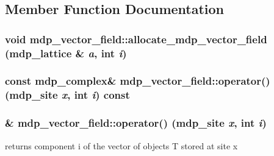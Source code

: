 \subsection{Member Function Documentation}
\hypertarget{classmdp__vector__field_ad8c24094484c978db191b9aab575d528}{
\subsubsection[{allocate\_\-mdp\_\-vector\_\-field}]{\setlength{\rightskip}{0pt plus 5cm}void mdp\_\-vector\_\-field::allocate\_\-mdp\_\-vector\_\-field ({\bf mdp\_\-lattice} \& {\em a}, \/  int {\em i})}}
\label{classmdp__vector__field_ad8c24094484c978db191b9aab575d528}
\hypertarget{classmdp__vector__field_a9e9eac5aef1e86f5ed72cba00dbf06be}{
\subsubsection[{operator()}]{\setlength{\rightskip}{0pt plus 5cm}const {\bf mdp\_\-complex}\& mdp\_\-vector\_\-field::operator() ({\bf mdp\_\-site} {\em x}, \/  int {\em i}) const}}
\label{classmdp__vector__field_a9e9eac5aef1e86f5ed72cba00dbf06be}
\hypertarget{classmdp__vector__field_aa50ba6cb67e5978d0e362b70ea703164}{
\subsubsection[{operator()}]{\& mdp\_\-vector\_\-field::operator() ({\bf mdp\_\-site} {\em x}, \/  int {\em i})}}
\label{classmdp__vector__field_aa50ba6cb67e5978d0e362b70ea703164}


returns component i of the vector of objects T stored at site x 

